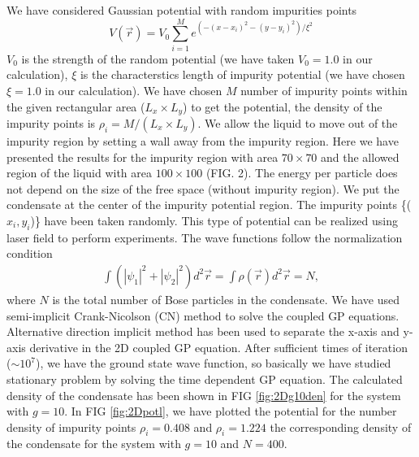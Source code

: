 \documentclass[amsmath,amssymb,lengthcheck,aps,prl] {revtex4}
\begin{document}
 We have considered Gaussian potential with random impurities points       \cite{Gaussian_Adhikari, Gaussian2018, Gaussian2014}
 \begin{equation}
   V (\vec{r}) = V_0 \sum_{i = 1}^M  e^{(-(x-x_i)^2-(y-y_i)^2)/\xi^2} 
 \end{equation}
 $V_0$ is the strength of the random potential (we have taken $V_0=1.0$ in our calculation), $\xi$ is the characterstics length of impurity potential (we have chosen $\xi=1.0$ in our calculation). We have chosen $M$ number of impurity points within the given rectangular area ($L_x \times L_y$) to get the potential, the density of the impurity points is $\rho_i = M/(L_x \times L_y)$. We allow the liquid to move out of the impurity region by setting a wall away from the impurity region. Here we have presented the results for the impurity region with area $70\times 70$ and the allowed region of the liquid with area $100\times 100$ (FIG. 2). The energy per particle does not depend on the size of the free space (without impurity region). We put the condensate at the center of the impurity potential region. The impurity points \{($x_i,y_i$)\} have been taken randomly. This type of potential can be realized using laser field to perform experiments\cite{speckle1}. The wave functions follow the normalization condition
 \begin{eqnarray}
   \int \left ( |\psi_1|^2 + |\psi_2|^2 \right ) d^2\vec{r} = \int \rho(\vec{r}) d^2\vec{r} = N,
 \end{eqnarray}
 where $N$ is the total number of Bose particles in the condensate.
 We have used semi-implicit Crank-Nicolson (CN) method to solve the coupled GP equations. Alternative direction implicit method \cite{ADC_method} has been used to separate the x-axis and y-axis  derivative in the 2D coupled GP equation. 
 After sufficient times of iteration ($\sim 10^7 $), we have the ground state wave function, so basically we have studied stationary problem by solving the time dependent GP equation.
The calculated density of the condensate has been shown in FIG \ref{fig:2Dg10den} for the system with $g=10$.
In FIG \ref{fig:2Dpotl}, we have plotted the potential for the number density of impurity points $\rho_i = 0.408$ and $\rho_i=1.224$ the corresponding density of the condensate for the system with $g=10$ and $N = 400$. 
\end{document}
